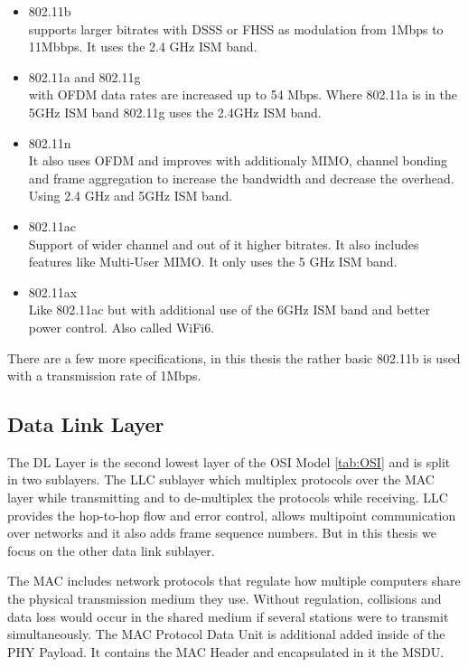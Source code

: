 \begin{itemize}
	\item 802.11b \\
	supports larger bitrates with \ac{DSSS} or \ac{FHSS} as modulation from 1Mbps to 11Mbbps.
	It uses the 2.4 GHz ISM band.
	\item 802.11a and 802.11g \\
	with \ac{OFDM} data rates are increased up to 54 Mbps.
	Where 802.11a is in the 5GHz ISM band 802.11g uses the 2.4GHz ISM band.
	\item 802.11n\\
	It also uses \ac{OFDM} and improves with additionaly \ac{MIMO}, channel bonding and frame aggregation to increase the bandwidth and decrease the overhead.
	Using 2.4 GHz and 5GHz ISM band.
	\item 802.11ac\\
	Support of wider channel and out of it higher bitrates. It also includes features like Multi-User MIMO.
	It only uses the 5 GHz ISM band.
	\item 802.11ax\\
	Like 802.11ac but with additional use of the 6GHz ISM band and better power control. 
	Also called WiFi6.
\end{itemize}

There are a few more specifications, in this thesis the rather basic 802.11b is used with a transmission rate of 1Mbps.

\subsection*{Data Link Layer}

The \ac{DL} Layer is the second lowest layer of the \ac{OSI} Model \ref{tab:OSI} and is split in two sublayers. 
The \ac{LLC} sublayer which multiplex protocols over the MAC layer while transmitting and to de-multiplex the protocols while receiving.
LLC provides the hop-to-hop flow and error control, allows multipoint communication over networks 
and it also adds frame sequence numbers.
But in this thesis we focus on the other data link sublayer.

The \ac{MAC} includes network protocols that regulate how multiple computers share the physical transmission medium they use. 
Without regulation, collisions and data loss would occur in the shared medium if several stations were to transmit simultaneously.
The \ac{MAC} Protocol Data Unit is additional added inside of the \ac{PHY} Payload. 
It contains the \ac{MAC} Header and encapsulated in it the \ac{MSDU}.

